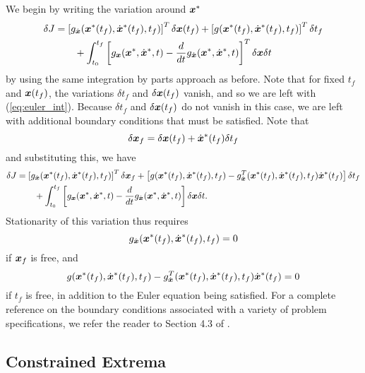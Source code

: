 We begin by writing the variation around $\bm{x}^*$
\begin{align}
\delta J &= \left[ g_{\dot{\bm{x}}}(\bm{x}^*(t_f),\dot{\bm{x}}^*(t_f),t_f) \right]^T \delta \bm{x}(t_f) + 
\left[ g(\bm{x}^*(t_f),\dot{\bm{x}}^*(t_f),t_f) \right]^T \delta t_f\\
& \qquad + \int_{t_0}^{t_f} \left[ g_{\bm{x}}(\bm{x}^*,\dot{\bm{x}}^*,t) - \frac{d}{dt} g_{\dot{\bm{x}}}(\bm{x}^*,\dot{\bm{x}}^*,t)\right]^T \delta \bm{x} \delta t \nonumber
\end{align}
by using the same integration by parts approach as before. Note that for fixed $t_f$ and $\bm{x}(t_f)$, the variations $\delta t_f$ and $\delta \bm{x}(t_f)$ vanish, and so we are left with (\ref{eq:euler_int}). Because $\delta t_f$ and $\delta \bm{x}(t_f)$ do not vanish in this case, we are left with additional boundary conditions that must be satisfied. Note that 
\begin{equation}
    \delta \bm{x}_f = \delta \bm{x}(t_f) + \dot{\bm{x}}^*(t_f) \delta t_f
\end{equation}
and substituting this, we have
\begin{align}
\delta J &= \left[ g_{\dot{\bm{x}}}(\bm{x}^*(t_f),\dot{\bm{x}}^*(t_f),t_f) \right]^T \delta \bm{x}_f + 
\left[ g(\bm{x}^*(t_f),\dot{\bm{x}}^*(t_f),t_f) - g^T_{\dot{\bm{x}}}(\bm{x}^*(t_f),\dot{\bm{x}}^*(t_f),t_f) \dot{\bm{x}}^*(t_f) \right] \delta t_f\\
& \qquad + \int_{t_0}^{t_f} \left[ g_{\bm{x}}(\bm{x}^*,\dot{\bm{x}}^*,t) - \frac{d}{dt} g_{\dot{\bm{x}}}(\bm{x}^*,\dot{\bm{x}}^*,t)\right] \delta \bm{x} \delta t \nonumber.
\end{align}
Stationarity of this variation thus requires 
\begin{equation}
    g_{\dot{\bm{x}}}(\bm{x}^*(t_f),\dot{\bm{x}}^*(t_f),t_f) = 0
\end{equation} 
if $\bm{x}_f$ is free, and 
\begin{equation}
    g(\bm{x}^*(t_f),\dot{\bm{x}}^*(t_f),t_f) - g^T_{\dot{\bm{x}}}(\bm{x}^*(t_f),\dot{\bm{x}}^*(t_f),t_f) \dot{\bm{x}}^*(t_f) = 0
\end{equation}
if $t_f$ is free, in addition to the Euler equation being satisfied. For a complete reference on the boundary conditions associated with a variety of problem specifications, we refer the reader to Section 4.3 of \cite{kirk2012optimal}.


\subsection{Constrained Extrema}

